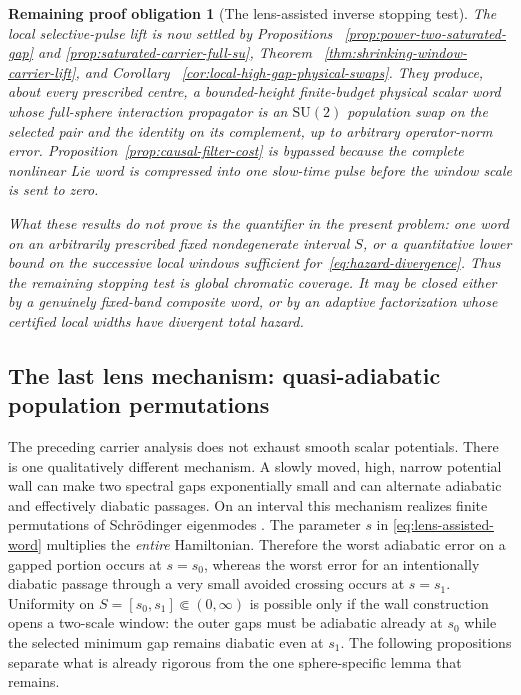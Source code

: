 \documentclass[11pt]{article}
\newtheorem{problem}[theorem]{Remaining proof obligation}
\theoremstyle{remark}
\begin{document}
\begin{problem}[The lens-assisted inverse stopping test]
 The local selective-pulse lift is now settled by Propositions
 ~\ref{prop:power-two-saturated-gap} and
 \ref{prop:saturated-carrier-full-su}, Theorem
 ~\ref{thm:shrinking-window-carrier-lift}, and Corollary
 ~\ref{cor:local-high-gap-physical-swaps}.  They produce, about every
 prescribed centre, a bounded-height finite-budget physical scalar word whose
 full-sphere interaction propagator is an $\mathrm{SU}(2)$ population swap on
 the selected pair and the identity on its complement, up to arbitrary
 operator-norm error.  Proposition~\ref{prop:causal-filter-cost} is bypassed
 because the complete nonlinear Lie word is compressed into one slow-time
 pulse before the window scale is sent to zero.

 What these results do not prove is the quantifier in the present problem:
 one word on an \emph{arbitrarily prescribed fixed} nondegenerate interval
 $S$, or a quantitative lower bound on the successive local windows sufficient
 for~\eqref{eq:hazard-divergence}.  Thus the remaining stopping test is global
 chromatic coverage.  It may be closed either by a genuinely fixed-band
 composite word, or by an adaptive factorization whose certified local widths
 have divergent total hazard.
\end{problem}

\subsection{The last lens mechanism: quasi-adiabatic population
permutations}

The preceding carrier analysis does not exhaust smooth scalar potentials.
There is one qualitatively different mechanism.  A slowly moved, high, narrow
potential wall can make two spectral gaps exponentially small and can
alternate adiabatic and effectively diabatic passages.  On an interval this
mechanism realizes finite permutations of Schr\"odinger eigenmodes
\cite{DucaJolyTuraev2020}.  The parameter $s$ in
\eqref{eq:lens-assisted-word} multiplies the \emph{entire} Hamiltonian.
Therefore the worst adiabatic error on a gapped portion occurs at
$s=s_0$, whereas the worst error for an intentionally diabatic passage
through a very small avoided crossing occurs at $s=s_1$.  Uniformity on
$S=[s_0,s_1]\Subset(0,\infty)$ is possible only if the wall construction
opens a two-scale window: the outer gaps must be adiabatic already at $s_0$
while the selected minimum gap remains diabatic even at $s_1$.  The following
propositions separate what is already rigorous from the one sphere-specific
lemma that remains.
\end{document}
